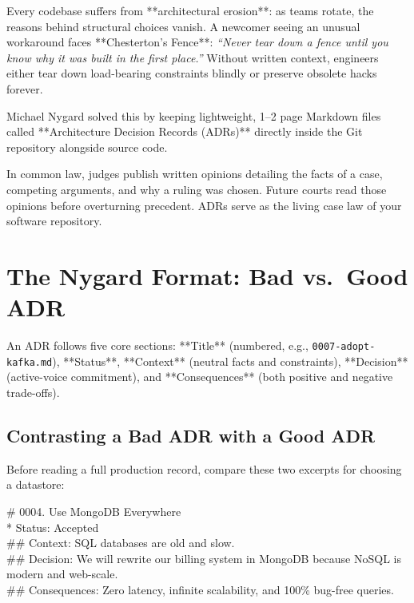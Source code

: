 Every codebase suffers from **architectural erosion**: as teams rotate, the reasons behind structural choices vanish. A newcomer seeing an unusual workaround faces **Chesterton's Fence**: \textit{``Never tear down a fence until you know why it was built in the first place.''} Without written context, engineers either tear down load-bearing constraints blindly or preserve obsolete hacks forever.

Michael Nygard solved this by keeping lightweight, 1--2 page Markdown files called **Architecture Decision Records (ADRs)** directly inside the Git repository alongside source code.

\begin{intuitionbox}
In common law, judges publish written opinions detailing the facts of a case, competing arguments, and why a ruling was chosen. Future courts read those opinions before overturning precedent. ADRs serve as the living case law of your software repository.
\end{intuitionbox}

\section{The Nygard Format: Bad vs.\ Good ADR}

An ADR follows five core sections: **Title** (numbered, e.g., \texttt{0007-adopt-kafka.md}), **Status**, **Context** (neutral facts and constraints), **Decision** (active-voice commitment), and **Consequences** (both positive and negative trade-offs).

\subsection{Contrasting a Bad ADR with a Good ADR}

Before reading a full production record, compare these two excerpts for choosing a datastore:

\begin{tcolorbox}[colback=warningBg, colframe=warningRed, boxrule=0pt, leftrule=3pt, title={\sffamily\bfseries\small Bad ADR Excerpt (Hype-Driven, Dishonest)}, coltitle=warningRed]
\small\ttfamily
\# 0004. Use MongoDB Everywhere\\
* Status: Accepted\\
\#\# Context: SQL databases are old and slow.\\
\#\# Decision: We will rewrite our billing system in MongoDB because NoSQL is modern and web-scale.\\
\#\# Consequences: Zero latency, infinite scalability, and 100\% bug-free queries.
\end{tcolorbox}

